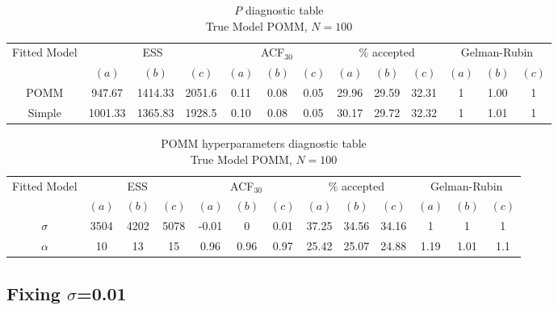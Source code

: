 \documentclass[11pt]{amsart}
\begin{document}
\begin{table}[htbp]
\centering
\caption*{
{\large $P$ diagnostic table} \\ 
{\small True Model POMM, $N=100$}
} 
\begin{tabular}{ccccccccccccc}
\toprule
\multirow{2}{*}{Fitted Model} & \multicolumn{3}{c}{ESS} & \multicolumn{3}{c}{
ACF$_{30}$} & \multicolumn{3}{c}{$\%$ accepted} & \multicolumn{3}{c}{Gelman-Rubin}\\
\cmidrule(lr){2-4} \cmidrule(lr){5-7} \cmidrule(lr){8-10} \cmidrule(lr){11-13} 
& $(a)$ & $(b)$ & $(c)$ & $(a)$ & $(b)$ & $(c)$ & $(a)$ & $(b)$ & $(c)$ & $(a)$ & $(b)$ & $(c)$ \\
\midrule
POMM &947.67 & 1414.33 & 2051.6 & 0.11 & 0.08 & 0.05 & 29.96 & 29.59 & 32.31 & 1 & 1.00 & 1 \\
Simple &1001.33 & 1365.83 & 1928.5 & 0.10 & 0.08 & 0.05 & 30.17 & 29.72 & 32.32 & 1 & 1.01 & 1\\
\bottomrule
\end{tabular}
\label{table:P_diagnostic_simple}
\end{table}


\begin{table}[htbp]
\centering
\caption*{
{\large POMM hyperparameters diagnostic table} \\ 
{\small True Model POMM, $N=100$}
} 
\begin{tabular}{ccccccccccccc}
\toprule
\multirow{2}{*}{Fitted Model} & \multicolumn{3}{c}{ESS} & \multicolumn{3}{c}{
ACF$_{30}$} & \multicolumn{3}{c}{$\%$ accepted} & \multicolumn{3}{c}{Gelman-Rubin}\\
\cmidrule(lr){2-4} \cmidrule(lr){5-7} \cmidrule(lr){8-10} \cmidrule(lr){11-13} 
& $(a)$ & $(b)$ & $(c)$ & $(a)$ & $(b)$ & $(c)$ & $(a)$ & $(b)$ & $(c)$ & $(a)$ & $(b)$ & $(c)$ \\
\midrule
$\sigma$ &3504 & 4202 & 5078 & -0.01 & 0 & 0.01 & 37.25 & 34.56 & 34.16 & 1 & 1 & 1 \\
$\alpha$ &10 & 13 & 15 & 0.96 & 0.96 & 0.97 & 25.42 & 25.07 & 24.88 & 1.19 & 1.01 & 1.1     \\
\bottomrule
\end{tabular}
\label{table:simulations_from_simple}
\end{table}

\clearpage

\subsection{Fixing $\sigma$=0.01}
\end{document}
